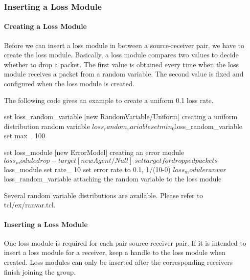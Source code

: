 \documentclass{article}
\begin{document}
\subsubsection{Inserting a Loss Module}
\label{sec:loss-config}
\paragraph{Creating a Loss Module}
Before we can insert a loss module in between a source-receiver pair,
we have to create the loss module.  Basically,
a loss module compares two values to decide whether to drop a packet.
The first value is obtained every time when the loss module receives 
a packet from a random variable.  The second value
is fixed and configured when the loss module is created.

The following code gives an example to create a uniform 
0.1 loss rate.

\begin{program}
set loss_random_variable [new RandomVariable/Uniform] \; creating a uniform distribution random variable
$loss_random_variable set min_ 0
$loss_random_variable set max_ 100

set loss_module [new ErrorModel]                    \; creating an error module
$loss_module drop-target [new Agent/Null]           \; set target for dropped packets
$loss_module set rate_ 10             \; set error rate to 0.1, 1/(10-0)
$loss_module ranvar $loss_random_variable \; attaching the random variable to the loss module
\end{program}

Several random variable distributions are available.  Please refer to
tcl/ex/ranvar.tcl.

\paragraph{Inserting a Loss Module}

One loss module is required for each pair source-receiver pair. If it is
intended to insert a loss module for a receiver, keep a handle to the 
loss module when created.  Loss modules can only be inserted after the
corresponding receivers finish joining the group.

\end{document}
